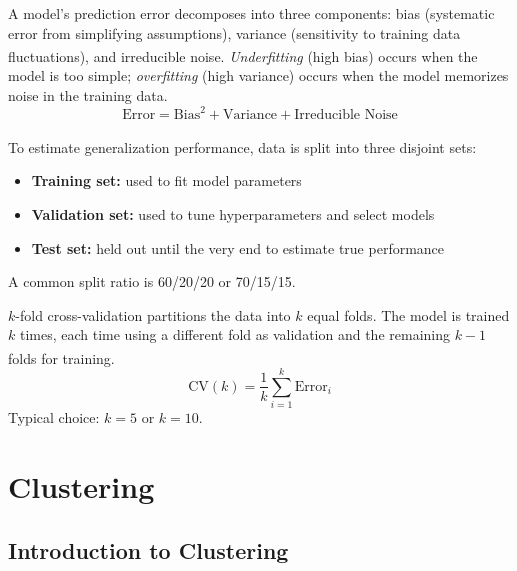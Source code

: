 \begin{tcbitemize}[ skin=sectionraster ]
    \tcbitem[title=Bias--Variance Trade-off, raster multicolumn=6]
    A model's prediction error decomposes into three components: bias (systematic error from simplifying assumptions), variance (sensitivity to training data fluctuations), and irreducible noise\textsuperscript{\cite[][pp.~14--25]{iiiCourseMachineLearning}}.
    \emph{Underfitting} (high bias) occurs when the model is too simple; \emph{overfitting} (high variance) occurs when the model memorizes noise in the training data.
    \tcblower
    \begin{equation}
        \text{Error} = \text{Bias}^2 + \text{Variance} + \text{Irreducible Noise}
    \end{equation}

    \tcbitem[title=Train/Validation/Test Split, raster multicolumn=3]
    To estimate generalization performance, data is split into three disjoint sets\textsuperscript{\cite[][pp.~18--20]{iiiCourseMachineLearning}}:
    \begin{itemize}
        \item \textbf{Training set:} used to fit model parameters
        \item \textbf{Validation set:} used to tune hyperparameters and select models
        \item \textbf{Test set:} held out until the very end to estimate true performance
    \end{itemize}
    A common split ratio is 60/20/20 or 70/15/15.

    \tcbitem[title=Cross-Validation, raster multicolumn=3]
    $k$-fold cross-validation partitions the data into $k$ equal folds.
    The model is trained $k$ times, each time using a different fold as validation and the remaining $k{-}1$ folds for training\textsuperscript{\cite[][pp.~20--22]{iiiCourseMachineLearning}}.
    \tcblower
    \begin{equation}
        \text{CV}(k) = \frac{1}{k}\sum_{i=1}^{k} \text{Error}_i
    \end{equation}
    Typical choice: $k = 5$ or $k = 10$.
\end{tcbitemize}
\section{Clustering}

\subsection{Introduction to Clustering}

